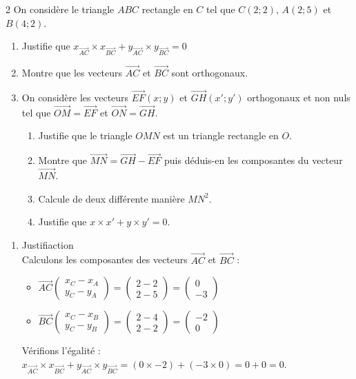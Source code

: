 \begin{multicols*}{2}
  	On considère le triangle $ ABC $ rectangle en $ C $ tel que $ C(2;2) $, $ A(2;5) $ et $ B(4;2) $.
  	\begin{enumerate}
  		\item Justifie que $ x_{\overrightarrow{AC}}\times x_{\overrightarrow{BC}}+y_{\overrightarrow{AC}}\times y_{\overrightarrow{BC}}=0 $
  		\item Montre que les vecteurs $ \overrightarrow{AC} $ et $ \overrightarrow{BC} $ sont orthogonaux.
  		\item On considère les vecteurs $ \overrightarrow{EF}(x;y) $ et $ \overrightarrow{GH}(x';y') $ orthogonaux et non nuls tel que $ \overrightarrow{OM}=\overrightarrow{EF} $ et $ \overrightarrow{ON}=\overrightarrow{GH} $.
  		\begin{enumerate}
  			\item Justifie que le triangle $ OMN $ est un triangle rectangle en $ O $.
  			\item Montre que $ \overrightarrow{MN}=\overrightarrow{GH}-\overrightarrow{EF} $ puis déduis-en les composantes du vecteur $ \overrightarrow{MN} $.
  			\item Calcule de deux différente manière $ MN^2 $.
  			\item Justifie que $ x\times x'+y\times y'=0 $.
  		\end{enumerate}
  	\end{enumerate}
  	\dure 
  	\resul
  	\begin{enumerate}
  		\item Justifiaction\\
  		Calculons les composantes des vecteurs $ \overrightarrow{AC}$ et $ \overrightarrow{BC}$ :
  		\begin{itemize}
  			\item $ \overrightarrow{AC} \begin{pmatrix} x_C - x_A \\ y_C - y_A \end{pmatrix} = \begin{pmatrix} 2 - 2 \\ 2 - 5 \end{pmatrix} = \begin{pmatrix} 0 \\ -3 \end{pmatrix}$
  			\item $ \overrightarrow{BC} \begin{pmatrix} x_C - x_B \\ y_C - y_B \end{pmatrix} = \begin{pmatrix} 2 - 4 \\ 2 - 2 \end{pmatrix} = \begin{pmatrix} -2 \\ 0 \end{pmatrix}$
  		\end{itemize}
  		Vérifions l'égalité :
  		$x_{ \overrightarrow{AC}} \times x_{ \overrightarrow{BC}} + y_{ \overrightarrow{AC}} \times y_{ \overrightarrow{BC}} = (0 \times -2) + (-3 \times 0) = 0 + 0 = 0$.
  		

\end{enumerate}
\end{multicols*}
